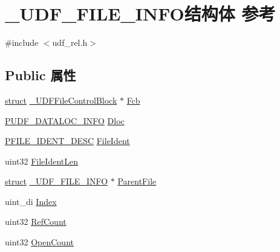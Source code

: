 \hypertarget{struct___u_d_f___f_i_l_e___i_n_f_o}{}\section{\+\_\+\+U\+D\+F\+\_\+\+F\+I\+L\+E\+\_\+\+I\+N\+F\+O结构体 参考}
\label{struct___u_d_f___f_i_l_e___i_n_f_o}


{\ttfamily \#include $<$udf\+\_\+rel.\+h$>$}

\subsection*{Public 属性}
\begin{DoxyCompactItemize}
\item 
\hyperlink{interfacestruct}{struct} \hyperlink{struct___u_d_f_file_control_block}{\+\_\+\+U\+D\+F\+File\+Control\+Block} $\ast$ \hyperlink{struct___u_d_f___f_i_l_e___i_n_f_o_a7d403e7b31cf51ae954af5fd4716d67e}{Fcb}
\item 
\hyperlink{struct___u_d_f___d_a_t_a_l_o_c___i_n_f_o}{P\+U\+D\+F\+\_\+\+D\+A\+T\+A\+L\+O\+C\+\_\+\+I\+N\+FO} \hyperlink{struct___u_d_f___f_i_l_e___i_n_f_o_a7a3581004b1dd01ed74fa5d05fa9e362}{Dloc}
\item 
\hyperlink{struct___f_i_l_e___i_d_e_n_t___d_e_s_c}{P\+F\+I\+L\+E\+\_\+\+I\+D\+E\+N\+T\+\_\+\+D\+E\+SC} \hyperlink{struct___u_d_f___f_i_l_e___i_n_f_o_aa0f68d065867f9542991b9a1b067fd38}{File\+Ident}
\item 
uint32 \hyperlink{struct___u_d_f___f_i_l_e___i_n_f_o_a2b38b6cc624ed9975551dec56989beaa}{File\+Ident\+Len}
\item 
\hyperlink{interfacestruct}{struct} \hyperlink{struct___u_d_f___f_i_l_e___i_n_f_o}{\+\_\+\+U\+D\+F\+\_\+\+F\+I\+L\+E\+\_\+\+I\+N\+FO} $\ast$ \hyperlink{struct___u_d_f___f_i_l_e___i_n_f_o_a97318fbf0ceee53b1ed74de061eee8ea}{Parent\+File}
\item 
uint\+\_\+di \hyperlink{struct___u_d_f___f_i_l_e___i_n_f_o_a97f61f59b02271c0d15c020c5db2d6ef}{Index}
\item 
uint32 \hyperlink{struct___u_d_f___f_i_l_e___i_n_f_o_a85481e6f042f1a009a946726bff601d7}{Ref\+Count}
\item 
uint32 \hyperlink{struct___u_d_f___f_i_l_e___i_n_f_o_a63684f986b55c2670e8d814b5797c080}{Open\+Count}
\item 
\mbox{\label{struct___u_d_f___f_i_l_e___i_n_f_o_af9a306f23208db95e86fb90eb0b9a7c1}} 

\end{DoxyCompactItemize}
